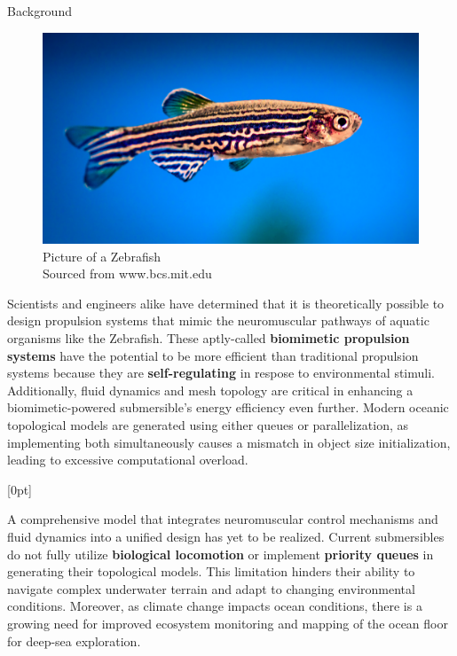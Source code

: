 \documentclass[final, 16pt]{beamer}
\newlength{\colwidth}
\begin{document}
\begin{frame}[t]
\begin{columns}[t]
\begin{column}{\colwidth}
\begin{block}{Background}
\begin{multicols}{2}
      \begin{figure}[H]
        \centering
        \includegraphics[width=0.95\linewidth]{img/Zebrafish.png}
        \caption{Picture of a Zebrafish \\ Sourced from www.bcs.mit.edu}
        \label{fig:zebrafish}
      \end{figure}
    \end{multicols}

    Scientists and engineers alike have determined that it is theoretically possible to design propulsion systems that mimic the neuromuscular pathways of aquatic organisms like the Zebrafish. These aptly-called \textbf{biomimetic propulsion systems} have the potential to be more efficient than traditional propulsion systems because they are \textbf{self-regulating} in respose to environmental stimuli. Additionally, fluid dynamics and mesh topology are critical in enhancing a biomimetic-powered submersible's energy efficiency even further. Modern oceanic topological models are generated using either queues or parallelization, as implementing both simultaneously causes a mismatch in object size initialization, leading to excessive computational overload.

    [0pt]

    \vspace{0.5cm}

    A comprehensive model that integrates neuromuscular control mechanisms and fluid dynamics into a unified design has yet to be realized. Current submersibles do not fully utilize \textbf{biological locomotion} or implement \textbf{priority queues} in generating their topological models. This limitation hinders their ability to navigate complex underwater terrain and adapt to changing environmental conditions. Moreover, as climate change impacts ocean conditions, there is a growing need for improved ecosystem monitoring and mapping of the ocean floor for deep-sea exploration.


\end{block}
\end{column}
\end{columns}
\end{frame}
\end{document}
